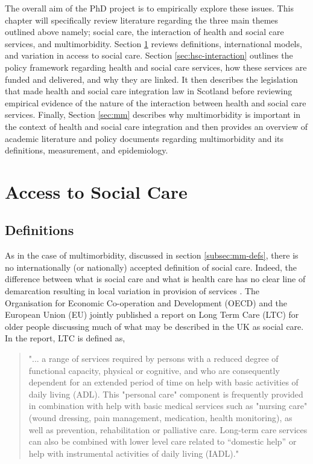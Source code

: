 \documentclass[12pt,]{report}
\begin{document}
The overall aim of the PhD project is to empirically explore these
issues. This chapter will specifically review literature regarding the
three main themes outlined above namely; social care, the interaction of
health and social care services, and multimorbidity. Section
\ref{sec:access-sc} reviews definitions, international models, and
variation in access to social care. Section \ref{sec:hsc-interaction}
outlines the policy framework regarding health and social care services,
how these services are funded and delivered, and why they are linked. It
then describes the legislation that made health and social care
integration law in Scotland before reviewing empirical evidence of the
nature of the interaction between health and social care services.
Finally, Section \ref{sec:mm} describes why multimorbidity is important
in the context of health and social care integration and then provides
an overview of academic literature and policy documents regarding
multimorbidity and its definitions, measurement, and epidemiology.

\section{Access to Social Care}\label{sec:access-sc}

\subsection{Definitions}\label{subsec:access-sc-defs}

As in the case of multimorbidity, discussed in section
\ref{subsec:mm-defs}, there is no internationally (or nationally)
accepted definition of social care. Indeed, the difference between what
is social care and what is health care has no clear line of demarcation
resulting in local variation in provision of services \citep{RN371}. The
Organisation for Economic Co-operation and Development (OECD) and the
European Union (EU) jointly published a report on Long Term Care (LTC)
for older people discussing much of what may be described in the UK as
social care. In the report, LTC is defined as,

\begin{quotation}
"... a range of services required by persons with a reduced degree of functional capacity, physical or cognitive, and who are consequently dependent for an extended period of time on help with basic activities of daily living (ADL). This "personal care" component is frequently provided in combination with help with basic medical services such as "nursing care" (wound dressing, pain management, medication, health monitoring), as well as prevention, rehabilitation or palliative care. Long-term care services can also be combined with lower level care related to “domestic help” or help with instrumental activities of daily living (IADL)." 
\end{quotation}
\end{document}
